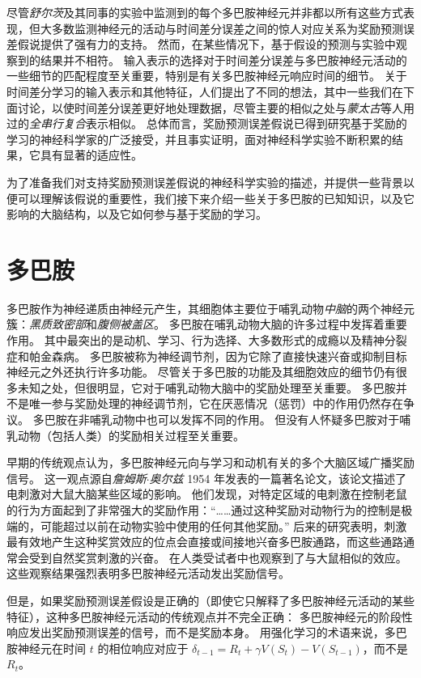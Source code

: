 尽管\textit{舒尔茨}及其同事的实验中监测到的每个多巴胺神经元并非都以所有这些方式表现，但大多数监测神经元的活动与时间差分误差之间的惊人对应关系为奖励预测误差假说提供了强有力的支持。
然而，在某些情况下，基于假设的预测与实验中观察到的结果并不相符。
输入表示的选择对于时间差分误差与多巴胺神经元活动的一些细节的匹配程度至关重要，特别是有关多巴胺神经元响应时间的细节。
关于时间差分学习的输入表示和其他特征，人们提出了不同的想法，其中一些我们在下面讨论，以使时间差分误差更好地处理数据，尽管主要的相似之处与\textit{蒙太古}等人用过的\textit{全串行复合}表示相似。
总体而言，奖励预测误差假说已得到研究基于奖励的学习的神经科学家的广泛接受，并且事实证明，面对神经科学实验不断积累的结果，它具有显著的适应性。


为了准备我们对支持奖励预测误差假说的神经科学实验的描述，并提供一些背景以便可以理解该假说的重要性，我们接下来介绍一些关于多巴胺的已知知识，以及它影响的大脑结构，以及它如何参与基于奖励的学习。


\section{多巴胺} \label{sec:dopamine}

多巴胺作为神经递质由神经元产生，其细胞体主要位于哺乳动物\textit{中脑}的两个神经元簇：\textit{黑质致密部}和\textit{腹侧被盖区}。
多巴胺在哺乳动物大脑的许多过程中发挥着重要作用。
其中最突出的是动机、学习、行为选择、大多数形式的成瘾以及精神分裂症和帕金森病。
多巴胺被称为神经调节剂，因为它除了直接快速兴奋或抑制目标神经元之外还执行许多功能。
尽管关于多巴胺的功能及其细胞效应的细节仍有很多未知之处，但很明显，它对于哺乳动物大脑中的奖励处理至关重要。
多巴胺并不是唯一参与奖励处理的神经调节剂，它在厌恶情况（惩罚）中的作用仍然存在争议。
多巴胺在非哺乳动物中也可以发挥不同的作用。
但没有人怀疑多巴胺对于哺乳动物（包括人类）的奖励相关过程至关重要。


早期的传统观点认为，多巴胺神经元向与学习和动机有关的多个大脑区域广播奖励信号。
这一观点源自\textit{詹姆斯$\cdot$奥尔兹} 1954 年发表的一篇著名论文，该论文描述了电刺激对大鼠大脑某些区域的影响。
他们发现，对特定区域的电刺激在控制老鼠的行为方面起到了非常强大的奖励作用：“……通过这种奖励对动物行为的控制是极端的，可能超过以前在动物实验中使用的任何其他奖励\cite{olds1954positive}。”
后来的研究表明，刺激最有效地产生这种奖赏效应的位点会直接或间接地兴奋多巴胺通路，而这些通路通常会受到自然奖赏刺激的兴奋。
在人类受试者中也观察到了与大鼠相似的效应。
这些观察结果强烈表明多巴胺神经元活动发出奖励信号。


但是，如果奖励预测误差假设是正确的（即使它只解释了多巴胺神经元活动的某些特征），这种多巴胺神经元活动的传统观点并不完全正确：
多巴胺神经元的阶段性响应发出奖励预测误差的信号，而不是奖励本身。
用强化学习的术语来说，多巴胺神经元在时间 $ t $ 的相位响应对应于 $ \delta_{t-1} = R_t + \gamma V(S_t) - V(S_{t-1}) $，而不是 $ R_t $。


